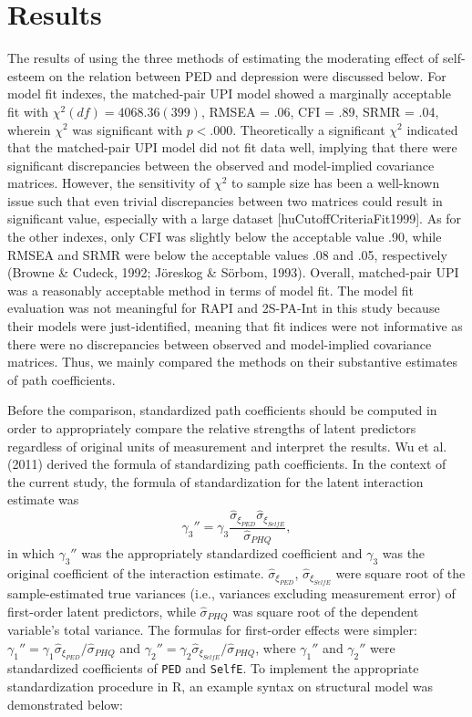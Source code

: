 \documentclass[
  man]{apa7}
\begin{document}
\hypertarget{results}{%
\section{Results}\label{results}}

The results of using the three methods of estimating the moderating effect of self-esteem on the relation between PED and depression were discussed below. For model fit indexes, the matched-pair UPI model showed a marginally acceptable fit with \(\chi^2(df) = 4068.36(399)\), RMSEA = .06, CFI = .89, SRMR = .04, wherein \(\chi^2\) was significant with \(\textit{p} < .000\). Theoretically a significant \(\chi^2\) indicated that the matched-pair UPI model did not fit data well, implying that there were significant discrepancies between the observed and model-implied covariance matrices. However, the sensitivity of \(\chi^2\) to sample size has been a well-known issue such that even trivial discrepancies between two matrices could result in significant value, especially with a large dataset {[}huCutoffCriteriaFit1999{]}. As for the other indexes, only CFI was slightly below the acceptable value .90, while RMSEA and SRMR were below the acceptable values .08 and .05, respectively (Browne \& Cudeck, 1992; Jöreskog \& Sörbom, 1993). Overall, matched-pair UPI was a reasonably acceptable method in terms of model fit. The model fit evaluation was not meaningful for RAPI and 2S-PA-Int in this study because their models were just-identified, meaning that fit indices were not informative as there were no discrepancies between observed and model-implied covariance matrices. Thus, we mainly compared the methods on their substantive estimates of path coefficients.

Before the comparison, standardized path coefficients should be computed in order to appropriately compare the relative strengths of latent predictors regardless of original units of measurement and interpret the results. Wu et al. (2011) derived the formula of standardizing path coefficients. In the context of the current study, the formula of standardization for the latent interaction estimate was
\begin{equation}
\gamma_{3}'' = \gamma_{3} \frac{\hat{\sigma}_{\xi_{PED}}\hat{\sigma}_{\xi_{SelfE}}}{\hat{\sigma}_{PHQ}},
\end{equation}
in which \(\gamma_{3}''\) was the appropriately standardized coefficient and \(\gamma_{3}\) was the original coefficient of the interaction estimate. \(\hat{\sigma}_{\xi_{PED}}\), \(\hat{\sigma}_{\xi_{SelfE}}\) were square root of the sample-estimated true variances (i.e., variances excluding measurement error) of first-order latent predictors, while \(\hat{\sigma}_{PHQ}\) was square root of the dependent variable's total variance. The formulas for first-order effects were simpler: \(\gamma_{1}'' = \gamma_{1}\hat{\sigma}_{\xi_{PED}}/\hat{\sigma}_{PHQ}\) and \(\gamma_{2}'' = \gamma_{2}\hat{\sigma}_{\xi_{SelfE}}/\hat{\sigma}_{PHQ}\), where \(\gamma_{1}''\) and \(\gamma_{2}''\) were standardized coefficients of \texttt{PED} and \texttt{SelfE}. To implement the appropriate standardization procedure in R, an example syntax on structural model was demonstrated below:
\end{document}
